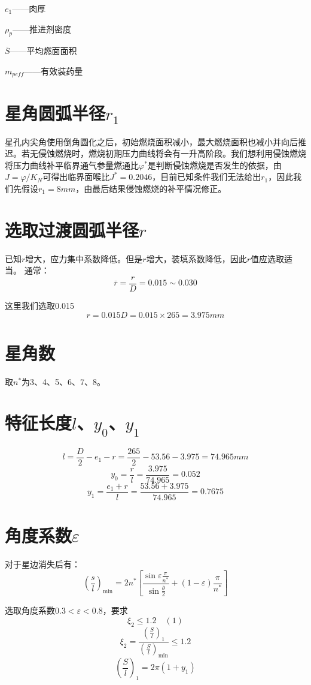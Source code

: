 $e_{1}$——肉厚

$\rho _{p}$——推进剂密度

$\overline{S}$——平均燃面面积

$m_{peff}$——有效装药量

\section{星角圆弧半径$r_{1}$}

星孔内尖角使用倒角圆化之后，初始燃烧面积减小，最大燃烧面积也减小并向后推迟。若无侵蚀燃烧时，燃烧初期压力曲线将会有一升高阶段。我们想利用侵蚀燃烧将压力曲线补平临界通气参量燃通比$\varphi^*$是判断侵蚀燃烧是否发生的依据，由$J=\varphi/K_N$可得出临界面喉比$J^*=0.2046$，目前已知条件我们无法给出$r_{1}$，因此我们先假设$r_{1}=8mm$，由最后结果侵蚀燃烧的补平情况修正。

\section{选取过渡圆弧半径$r$}
已知$r$增大，应力集中系数降低。但是$r$增大，装填系数降低，因此$r$值应选取适当。
通常：
\[
\overline{r}=\frac{r}{D}=0.015\sim 0.030
\]

这里我们选取0.015
\[
  r=0.015D=0.015\times 265=3.975mm
\]

\section{星角数}

取$n^*$为3、4、5、6、7、8。

\section{特征长度$l$、$y_{0}$、$y_{1}$}
\[
l=\frac{D}{2}-e_1-r=\frac{265}{2}-53.56-3.975=74.965mm
\]
\[
y_0=\frac{r}{l}=\frac{3.975}{74.965}=0.052
\]
\[
y_1=\frac{e_1+r}{l}=\frac{53.56+3.975}{74.965}=0.7675
\]

\section{角度系数\texorpdfstring{$\varepsilon $}{}}

对于星边消失后有：
\[
\left( \frac{s}{l} \right) _{\min}=2n^*\left[ \frac{\sin \varepsilon \frac{\pi}{n^*}}{\sin \frac{\overline{\theta }}{2}}+(1-\varepsilon )\frac{\pi}{n^*} \right] 
\]

选取角度系数$0.3< \varepsilon <0.8$，要求
\[
\xi _2\leqslant 1.2  \hspace{1em}(1)
\]
\[
\xi _2=\frac{\left( \frac{S}{l} \right) _1}{\left( \frac{S}{l} \right) _{\min}}\le 1.2
\]
\[
  \left( \frac{S}{l} \right) _1=2\pi(1+y_{1})
\]

